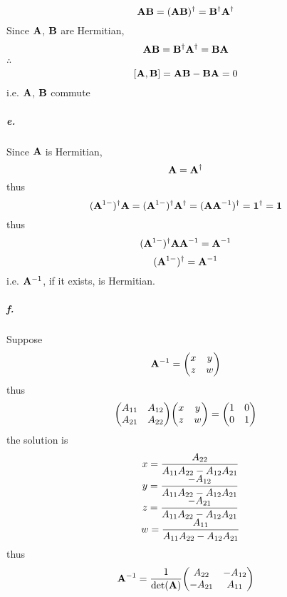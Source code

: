 \documentclass[a4paper]{article}
\newcommand{\subex}[1]{\subparagraph{#1}}
\newcommand{\iden}{{\large \bm{1}}}
\numberwithin{equation}{section}
\begin{document}
\begin{equation}\label{key}
\vb{A}\vb{B} = (\vb{A}\vb{B})^\dagger = \vb{B}^\dagger \vb{A}^\dagger
\end{equation}
Since $ \vb{A} $, $ \vb{B} $ are Hermitian,
\begin{equation}\label{key}
\vb{A}\vb{B} = \vb{B}^\dagger \vb{A}^\dagger = \vb{B}\vb{A}
\end{equation}
$ \therefore $
\begin{equation}\label{key}
[\vb{A}, \vb{B}] = \vb{A}\vb{B} - \vb{B}\vb{A} = 0
\end{equation}
i.e. $ \vb{A} $, $ \vb{B} $ commute
\subex{e.}
Since $ \vb{A} $ is Hermitian,
\begin{equation}\label{key}
\vb{A} = \vb{A}^\dagger
\end{equation}
thus
\begin{equation}\label{key}
(\vb{A}^{1-})^\dagger \vb{A} = (\vb{A}^{1-})^\dagger \vb{A}^\dagger = (\vb{A}\vb{A}^{-1})^\dagger = \iden^\dagger = \iden
\end{equation}
thus
\begin{equation}\label{key}
(\vb{A}^{1-})^\dagger \vb{A} \vb{A}^{-1} = \vb{A}^{-1}
\end{equation}
\begin{equation}\label{key}
(\vb{A}^{1-})^\dagger = \vb{A}^{-1}
\end{equation}
i.e. $ \vb{A}^{-1} $, if it exists, is Hermitian.
\subex{f.}
Suppose
\begin{equation}\label{key}
\vb{A}^{-1} = \mqty(x & y\\z & w)
\end{equation}
thus
\begin{equation}\label{key}
\mqty(A_{11} & A_{12}\\A_{21} & A_{22})\mqty(x & y\\z & w) = \mqty(1 & 0\\0 & 1)
\end{equation}
the solution is
\begin{equation}\label{key}
\mqty{
	&x = \dfrac{A_{22}}{A_{11}A_{22} - A_{12}A_{21}}\\
	&y = \dfrac{-A_{12}}{A_{11}A_{22} - A_{12}A_{21}}\\
	&z = \dfrac{-A_{21}}{A_{11}A_{22} - A_{12}A_{21}}\\
	&w = \dfrac{A_{11}}{A_{11}A_{22} - A_{12}A_{21}}\\ 
}
\end{equation}
thus
\begin{equation}\label{key}
\vb{A}^{-1} = \dfrac{1}{\det(\vb{A})} \mqty(A_{22} & -A_{12}\\ -A_{21} & A_{11})
\end{equation}
\end{document}
